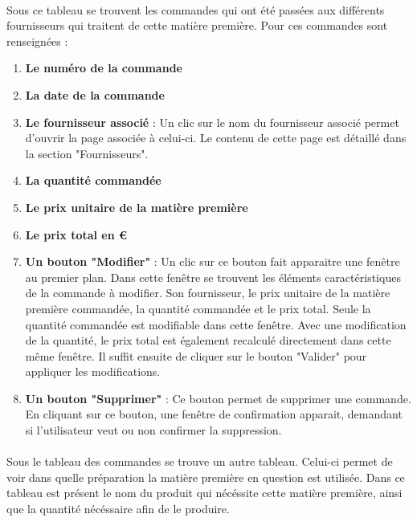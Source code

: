 \paragraph{}
Sous ce tableau se trouvent les commandes qui ont été passées aux différents 
fournisseurs qui traitent de cette matière première. Pour ces commandes sont 
renseignées :
\begin{enumerate}
  \item \textbf{Le numéro de la commande}
  \item \textbf{La date de la commande}
  \item \textbf{Le fournisseur associé} : Un clic sur le nom du fournisseur 
  associé permet d'ouvrir la page associée à celui-ci. Le contenu de cette page 
  est détaillé dans la section "Fournisseurs".
  \item \textbf{La quantité commandée}
  \item \textbf{Le prix unitaire de la matière première}
  \item \textbf{Le prix total en €}
  \item \textbf{Un bouton "Modifier"} : Un clic sur ce bouton fait apparaitre 
  une fenêtre au premier plan. Dans cette fenêtre se trouvent les éléments 
  caractéristiques de la commande à modifier. Son fournisseur, le prix unitaire 
  de la matière première commandée, la quantité commandée et le prix total.
  Seule la quantité commandée est modifiable dans cette fenêtre. Avec une 
  modification de la quantité, le prix total est également recalculé 
  directement dans cette même fenêtre. Il suffit ensuite de cliquer sur le 
  bouton "Valider" pour appliquer les modifications.

  \item \textbf{Un bouton "Supprimer"} : Ce bouton permet de supprimer une 
  commande. En cliquant sur ce bouton, une fenêtre de confirmation apparait, 
  demandant si l'utilisateur veut ou non confirmer la suppression.
\end{enumerate}

\paragraph{}
Sous le tableau des commandes se trouve un autre tableau. Celui-ci permet de 
voir dans quelle préparation la matière première en question est utilisée. Dans 
ce tableau est présent le nom du produit qui nécéssite cette matière première, 
ainsi que la quantité nécéssaire afin de le produire.



